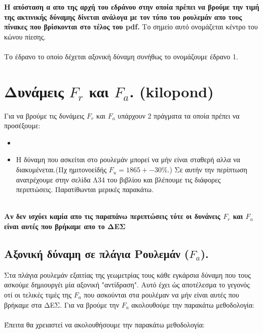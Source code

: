 \documentclass{article}
\begin{document}
\textbf{Η απόσταση α απο της αρχή του εδράνου στην οποία πρέπει να βρούμε την τιμή της ακτινικής δύναμης δίνεται ανάλογα με τον τύπο του ρουλεμάν απο τους πίνακες που βρίσκονται στο τέλος του pdf.} Το σημείο αυτό ονομάζεται κέντρο του κώνου πίεσης.
\\
\\
Το έδρανο το οποίο δέχεται αξονική δύναμη συνήθως το ονομάζουμε έδρανο 1.
\\


\section{Δυνάμεις $F_r$ και $F_a$. \tiny{(kilopond)}}
Για να βρούμε τις δυνάμεις $F_r$ και $F_a$ υπάρχουν 2 πράγματα τα οποία πρέπει να προσέξουμε:
\\
\begin{itemize}
    \item {}
    \item Η δύναμη που ασκείται στο ρουλεμάν μπορεί να μήν είναι σταθερή αλλα να διακυμένεται.(Πχ ημιτονοείδής $F_u = 1865 +- 30\%$.) Σε αυτήν την περίπτωση ανατρέχουμε στην σελίδα Λ34 του βιβλίου και βλέπουμε τις διάφορες περιπτώσεις. Παρατίθωνται μερικές παρακάτω.
\end{itemize}
\\
\textbf{Αν δεν ισχύει καμία απο τις παραπάνω περιπτώσεις τότε οι δυνάνεις $F_r$ και $F_a$ είναι αυτές που βρήκαμε απο το ΔΕΣ}


\subsection{Αξονική δύναμη σε πλάγια Ρουλεμάν ($F_a$).}
Στα πλάγια ρουλεμάν εξαιτίας της γεωμετρίας τους κάθε εγκάρσια δύναμη που τους ασκούμε δημιουργέι μία αξονική "αντίδραση". Αυτό έχει ώς αποτέλεσμα το γεγονός οτί οι τελικές τιμές της $F_a$ που ασκούνται στα ρουλέμαν να μήν είναι αυτές που βρήκαμε στα ΔΕΣ. Για να βρούμε την $F_a$ ακολουθούμε την παρακάτω μεθοδολογία:
\\
\\
Έπειτα θα χρειαστεί να ακολουθήσουμε την παρακάτω μεθοδολογία:
\end{document}
